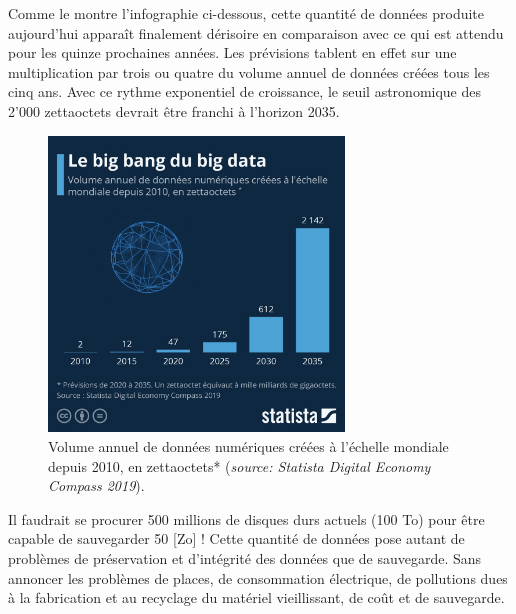 Comme le montre l’infographie ci-dessous, cette quantité de données produite aujourd'hui apparaît finalement dérisoire en comparaison avec ce qui est attendu pour les quinze prochaines années. Les prévisions tablent en effet sur une multiplication par trois ou quatre du volume annuel de données créées tous les cinq ans. Avec ce rythme exponentiel de croissance, le seuil astronomique des 2’000 zettaoctets devrait être franchi à l’horizon 2035.
\begin{figure}[h!]
	\centering
	\includegraphics[trim=0 0 0 0,width=0.7\textwidth]{Images/stockage/statista.jpeg}
	\caption{Volume annuel de données numériques créées à l’échelle mondiale depuis 2010, en zettaoctets* (\textit{source: Statista Digital Economy Compass 2019}).}
\end{figure}
Il faudrait se procurer 500 millions de disques durs actuels (100 To) pour être capable de sauvegarder 50 [Zo] ! Cette quantité de données pose autant de problèmes de préservation et d’intégrité des données que de sauvegarde. Sans annoncer les problèmes de places, de consommation électrique, de pollutions dues à la fabrication et au recyclage du matériel vieillissant, de coût et de sauvegarde.


